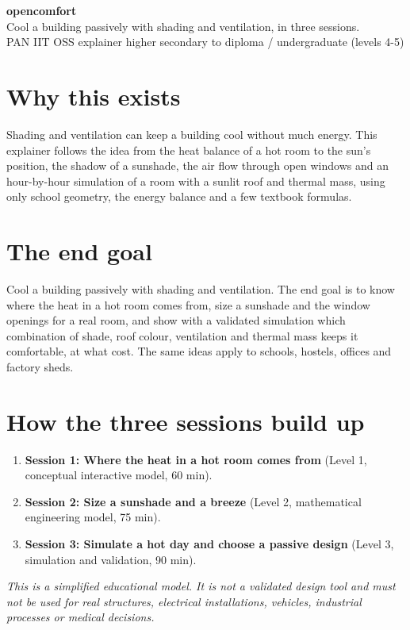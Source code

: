 \documentclass[11pt,a4paper]{article}
\begin{document}
\begin{center}{\LARGE\bfseries opencomfort}\\[0.4em]{\large Cool a building passively with shading and ventilation, in three sessions.}\\[0.2em]\small PAN IIT OSS explainer \textbullet{} higher secondary to diploma / undergraduate (levels 4-5)\end{center}

\section*{Why this exists}
Shading and ventilation can keep a building cool without much energy. This explainer follows the idea from the heat balance of a hot room to the sun's position, the shadow of a sunshade, the air flow through open windows and an hour-by-hour simulation of a room with a sunlit roof and thermal mass, using only school geometry, the energy balance and a few textbook formulas.

\section*{The end goal}
Cool a building passively with shading and ventilation. The end goal is to know where the heat in a hot room comes from, size a sunshade and the window openings for a real room, and show with a validated simulation which combination of shade, roof colour, ventilation and thermal mass keeps it comfortable, at what cost. The same ideas apply to schools, hostels, offices and factory sheds.

\section*{How the three sessions build up}
\begin{enumerate}[nosep]
\item \textbf{Session 1: Where the heat in a hot room comes from} (Level 1, conceptual interactive model, 60 min).
\item \textbf{Session 2: Size a sunshade and a breeze} (Level 2, mathematical engineering model, 75 min).
\item \textbf{Session 3: Simulate a hot day and choose a passive design} (Level 3, simulation and validation, 90 min).
\end{enumerate}

\textit{This is a simplified educational model. It is not a validated design tool and must not be used for real structures, electrical installations, vehicles, industrial processes or medical decisions.}
\end{document}
